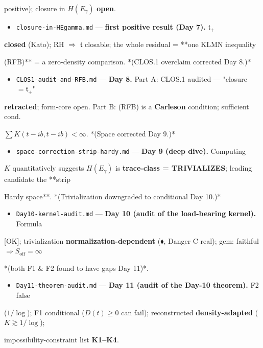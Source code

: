 \documentclass[10pt]{article}
\begin{document}
  positive); closure in $H(E_\gamma)$ \textbf{open}.\par
\begin{itemize}
\item \texttt{closure-in-HEgamma.md} --- \textbf{first positive result (Day 7).} $\mathfrak t_+$
\end{itemize}
  \textbf{closed} (Kato); RH $\Rightarrow$ $\mathfrak t$ closable; the whole residual = **one KLMN inequality\par
  (RFB)** = a zero-density comparison. *(CLOS.1 overclaim corrected Day 8.)*\par
\begin{itemize}
\item \texttt{CLOS1-audit-and-RFB.md} --- \textbf{Day 8.} Part A: CLOS.1 audited --- "closure$=\mathfrak t_+$"
\end{itemize}
  \textbf{retracted}; form-core open. Part B: (RFB) is a \textbf{Carleson} condition; sufficient cond.\par
  $\sum K(t-ib,t-ib)<\infty$. *(Space corrected Day 9.)*\par
\begin{itemize}
\item \texttt{space-correction-strip-hardy.md} --- \textbf{Day 9 (deep dive).} Computing
\end{itemize}
  $K$ quantitatively suggests $H(E_\gamma)$ is \textbf{trace-class = TRIVIALIZES}; leading candidate the **strip\par
  Hardy space**. *(Trivialization downgraded to conditional Day 10.)*\par
\begin{itemize}
\item \texttt{Day10-kernel-audit.md} --- \textbf{Day 10 (audit of the load-bearing kernel).} Formula
\end{itemize}
  [OK]; trivialization \textbf{normalization-dependent} ($\blacklozenge$, Danger C real); gem: faithful $\Rightarrow S_{\mathrm{off}}=\infty$\par
  *(both F1 \& F2 found to have gaps Day 11)*.\par
\begin{itemize}
\item \texttt{Day11-theorem-audit.md} --- \textbf{Day 11 (audit of the Day-10 theorem).} F2 false
\end{itemize}
  ($1/\log$); F1 conditional ($D(t)\ge0$ can fail); reconstructed \textbf{density-adapted} ($K\gtrsim1/\log$);\par
  impossibility-constraint list \textbf{K1--K4}.\par
\end{document}
